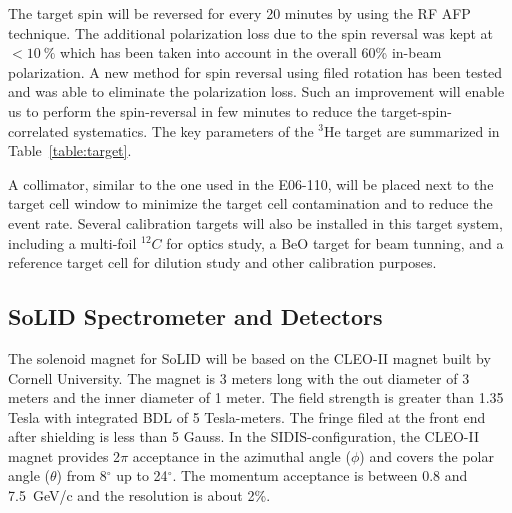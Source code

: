 The target spin will be reversed for every 20 minutes by using the RF AFP technique. The additional polarization loss due to the spin reversal was kept at $<10~\%$ which has been taken into account in the overall 60\% in-beam polarization. A new method for spin reversal using filed rotation has been tested and was able to eliminate the polarization loss. Such an improvement will enable us to perform the spin-reversal in few minutes to reduce the target-spin-correlated systematics. The key parameters of the $\mathrm{^{3}He}$ target are summarized in Table~\ref{table:target}.
  
A collimator, similar to the one used in the E06-110, will be placed next to the target cell window to minimize the target cell contamination and to reduce the event rate. Several calibration targets will also be installed in this target system, including a multi-foil $^{12}C$ for optics study, a BeO target for beam tunning, and a reference target cell for dilution study and other calibration purposes.
  
\subsection {SoLID Spectrometer and Detectors} 
The solenoid magnet for SoLID will be based on the CLEO-II magnet built by Cornell University. The magnet is 3 meters long with the out diameter of 3 meters and the inner diameter of 1 meter. The field strength is greater than 1.35 Tesla with integrated BDL of 5 Tesla-meters. The fringe filed at the front end after shielding is less than 5 Gauss. In the SIDIS-configuration, the CLEO-II magnet provides 2$\pi$ acceptance in the azimuthal angle ($\phi$) and covers the polar angle ($\theta$) from 8$^{\circ}$ up to 24$^{\circ}$. The momentum acceptance is between 0.8 and 7.5~GeV/c and the resolution is about 2\%. 

